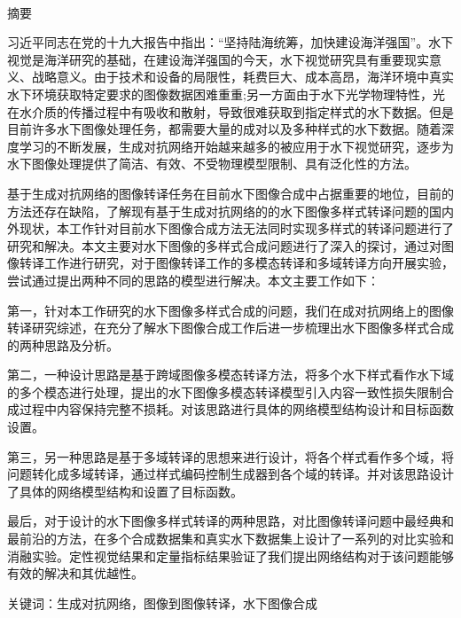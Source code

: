 \newpage

\pagestyle{plain}
\clearpage{}

\begin{center}
  {\sanhao[1.5]\heiti\oucctitle\\\vskip7pt 摘\hspace{1em}要}
\end{center}
{\normalsize\songti

习近平同志在党的十九大报告中指出：“坚持陆海统筹，加快建设海洋强国”。水下视觉是海洋研究的基础，在建设海洋强国的今天，水下视觉研究具有重要现实意义、战略意义。由于技术和设备的局限性，耗费巨大、成本高昂，海洋环境中真实水下环境获取特定要求的图像数据困难重重;另一方面由于水下光学物理特性，光在水介质的传播过程中有吸收和散射，导致很难获取到指定样式的水下数据。但是目前许多水下图像处理任务，都需要大量的成对以及多种样式的水下数据。随着深度学习的不断发展，生成对抗网络开始越来越多的被应用于水下视觉研究，逐步为水下图像处理提供了简洁、有效、不受物理模型限制、具有泛化性的方法。

基于生成对抗网络的图像转译任务在目前水下图像合成中占据重要的地位，目前的方法还存在缺陷，了解现有基于生成对抗网络的的水下图像多样式转译问题的国内外现状，本工作针对目前水下图像合成方法无法同时实现多样式的转译问题进行了研究和解决。本文主要对水下图像的多样式合成问题进行了深入的探讨，通过对图像转译工作进行研究，对于图像转译工作的多模态转译和多域转译方向开展实验，尝试通过提出两种不同的思路的模型进行解决。本文主要工作如下：

第一，针对本工作研究的水下图像多样式合成的问题，我们在成对抗网络上的图像转译研究综述，在充分了解水下图像合成工作后进一步梳理出水下图像多样式合成的两种思路及分析。

第二，一种设计思路是基于跨域图像多模态转译方法，将多个水下样式看作水下域的多个模态进行处理，提出的水下图像多模态转译模型引入内容一致性损失限制合成过程中内容保持完整不损耗。对该思路进行具体的网络模型结构设计和目标函数设置。

第三，另一种思路是基于多域转译的思想来进行设计，将各个样式看作多个域，将问题转化成多域转译，通过样式编码控制生成器到各个域的转译。并对该思路设计了具体的网络模型结构和设置了目标函数。

最后，对于设计的水下图像多样式转译的两种思路，对比图像转译问题中最经典和最前沿的方法，在多个合成数据集和真实水下数据集上设计了一系列的对比实验和消融实验。定性视觉结果和定量指标结果验证了我们提出网络结构对于该问题能够有效的解决和其优越性。
}
\vskip12bp
{\xiaosi\heiti\noindent
关键词：生成对抗网络，图像到图像转译，水下图像合成}

